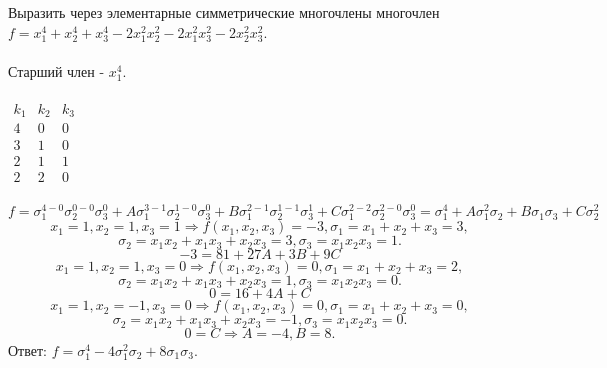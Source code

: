 \documentclass[12pt]{article}
\begin{document}
\begin{examp}
Выразить через элементарные симметрические многочлены многочлен $f = x_1^4 + x_2^4 + x_3^4 - 2x_1^2x_2^2 - 2x_1^2x_3^2 - 2x_2^2x_3^2$. \\ \\
\indent Старший член - $x_1^4$. \\ \\
$\begin{array}{c|c|c}
  k_1 & k_2 & k_3 \\ \hline
  4 & 0 & 0 \\
  3 & 1 & 0 \\
  2 & 1 & 1 \\
  2 & 2 & 0
\end{array}$ \\ \\
$$f = \sigma_1^{4-0}\sigma_2^{0-0}\sigma_3^{0} + A\sigma_1^{3-1}\sigma_2^{1-0}\sigma_3^{0} + B\sigma_1^{2-1}\sigma_2^{1-1}\sigma_3^{1} + C\sigma_1^{2-2}\sigma_2^{2-0}\sigma_3^{0} = \sigma_1^{4} + A\sigma_1^{2}\sigma_2 + B\sigma_1\sigma_3 + C\sigma_2^{2}$$
$$x_1 = 1, x_2 = 1, x_3 = 1 \Rightarrow f(x_1,x_2,x_3) = -3, \sigma_1 = x_1 + x_2 + x_3 = 3,$$
$$\sigma_2 = x_1x_2 + x_1x_3 + x_2x_3 = 3, \sigma_3 = x_1x_2x_3 = 1.$$
$$-3 = 81 + 27A + 3B + 9C$$
$$x_1 = 1, x_2 = 1, x_3 = 0 \Rightarrow f(x_1,x_2,x_3) = 0, \sigma_1 = x_1 + x_2 + x_3 = 2,$$
$$\sigma_2 = x_1x_2 + x_1x_3 + x_2x_3 = 1, \sigma_3 = x_1x_2x_3 = 0.$$
$$0 = 16 + 4A + C$$
$$x_1 = 1, x_2 = -1, x_3 = 0 \Rightarrow f(x_1,x_2,x_3) = 0, \sigma_1 = x_1 + x_2 + x_3 = 0,$$
$$\sigma_2 = x_1x_2 + x_1x_3 + x_2x_3 = -1, \sigma_3 = x_1x_2x_3 = 0.$$
$$0 = C \Rightarrow A = -4, B = 8.$$
Ответ: $f = \sigma_1^4 - 4\sigma_1^2\sigma_2 + 8\sigma_1\sigma_3$.
\end{examp}
\end{document}
